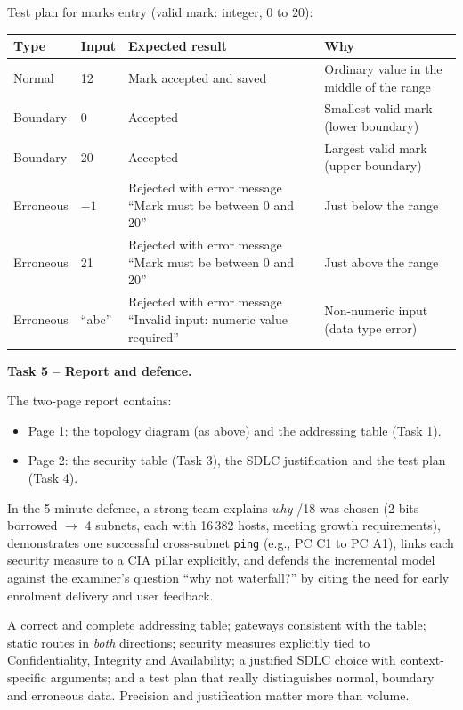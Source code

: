 \documentclass[11pt]{article}
\begin{document}
Test plan for marks entry (valid mark: integer, 0 to 20):

\begin{center}
\begin{tabularx}{\linewidth}{|l|X|X|X|}
\hline
\rowcolor{popblueL} \textbf{Type} & \textbf{Input} & \textbf{Expected result} & \textbf{Why} \\
\hline
Normal & 12 & Mark accepted and saved & Ordinary value in the middle of the range \\
\hline
Boundary & 0 & Accepted & Smallest valid mark (lower boundary) \\
\hline
Boundary & 20 & Accepted & Largest valid mark (upper boundary) \\
\hline
Erroneous & $-1$ & Rejected with error message ``Mark must be between 0 and 20'' & Just below the range \\
\hline
Erroneous & 21 & Rejected with error message ``Mark must be between 0 and 20'' & Just above the range \\
\hline
Erroneous & ``abc'' & Rejected with error message ``Invalid input: numeric value required'' & Non-numeric input (data type error) \\
\hline
\end{tabularx}
\end{center}

\textbf{Task 5 -- Report and defence.}

The two-page report contains:
\begin{itemize}
\item Page 1: the topology diagram (as above) and the addressing table (Task 1).
\item Page 2: the security table (Task 3), the SDLC justification and the test plan (Task 4).
\end{itemize}

In the 5-minute defence, a strong team explains \emph{why} /18 was chosen (2 bits borrowed $\rightarrow$ 4 subnets, each with 16\,382 hosts, meeting growth requirements), demonstrates one successful cross-subnet \texttt{ping} (e.g., PC C1 to PC A1), links each security measure to a CIA pillar explicitly, and defends the incremental model against the examiner's question ``why not waterfall?'' by citing the need for early enrolment delivery and user feedback.

\begin{aretenir}
A correct and complete addressing table; gateways consistent with the table; static routes in \emph{both} directions; security measures explicitly tied to Confidentiality, Integrity and Availability; a justified SDLC choice with context-specific arguments; and a test plan that really distinguishes normal, boundary and erroneous data. Precision and justification matter more than volume.
\end{aretenir}
\end{document}
